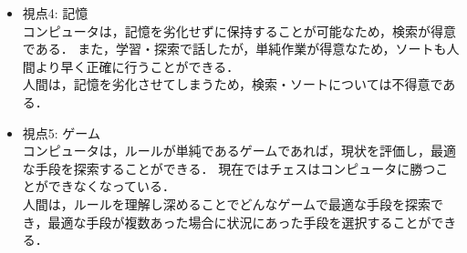 \begin{itemize}
 \item 視点4: 記憶\\
	コンピュータは，記憶を劣化せずに保持することが可能なため，検索が得意である．
また，学習・探索で話したが，単純作業が得意なため，ソートも人間より早く正確に行うことができる．\\
	人間は，記憶を劣化させてしまうため，検索・ソートについては不得意である．

 \item 視点5: ゲーム\\
	コンピュータは，ルールが単純であるゲームであれば，現状を評価し，最適な手段を探索することができる．
現在ではチェスはコンピュータに勝つことができなくなっている．\\
	人間は，ルールを理解し深めることでどんなゲームで最適な手段を探索でき，最適な手段が複数あった場合に状況にあった手段を選択することができる．

\end{itemize}

